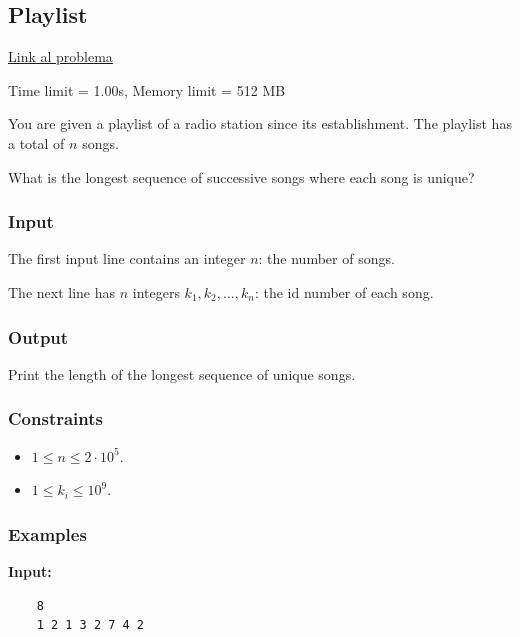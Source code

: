 \newpage

\subsection{Playlist}

\label{problema:pattern-algoritmici:sliding-window:playlist}

\href{https://cses.fi/problemset/task/1141}{Link al problema}

\noindent Time limit = 1.00s, Memory limit = 512 MB
\bigskip

You are given a playlist of a radio station since its establishment. The playlist has a total of $n$ songs.

\medskip

What is the longest sequence of successive songs where each song is unique?

\subsubsection*{Input}
The first input line contains an integer $n$: the number of songs.

\medskip
\noindent The next line has $n$ integers $k_1,k_2,\ldots,k_n$: the id number of each song.

\subsubsection*{Output}
Print the length of the longest sequence of unique songs.


\subsubsection*{Constraints}

\begin{itemize}
	\item $1 \le n \le 2 \cdot 10^5$.
	\item $1 \le k_i \le 10^9$.
\end{itemize}


\subsubsection*{Examples}
\renewcommand{\arraystretch}{1.5}  

\smallskip  
\textbf{Input:}  
\begin{verbatim}
	8
	1 2 1 3 2 7 4 2
\end{verbatim}

